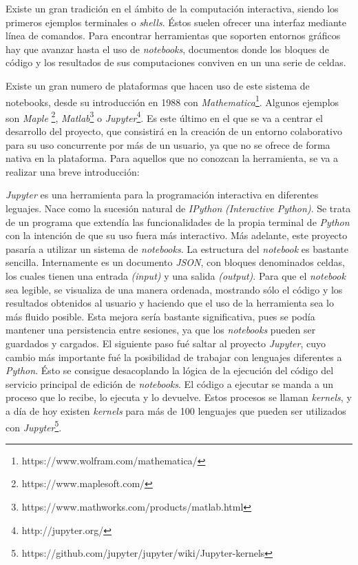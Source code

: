 \documentclass[11pt,spanish,listoffigures]{tfgetsinf}
\begin{document}
Existe un gran tradición en el ámbito de la computación interactiva, siendo los primeros ejemplos terminales o \textit{shells}. Éstos suelen ofrecer una interfaz mediante línea de comandos. Para encontrar herramientas que soporten entornos gráficos hay que avanzar hasta el uso de \textit{\gls{notebook}s}, documentos donde los bloques de código y los resultados de sus computaciones conviven en un una serie de celdas.

Existe un gran numero de plataformas que hacen uso de este sistema de notebooks, desde su introducción en 1988 con \textit{Mathematica}\footnote{https://www.wolfram.com/mathematica/}. Algunos ejemplos son \textit{Maple} \footnote{https://www.maplesoft.com/}, \textit{Matlab}\footnote{https://www.mathworks.com/products/matlab.html} o \textit{Jupyter}\footnote{http://jupyter.org/}. Es este último en el que se va a centrar el desarrollo del proyecto, que consistirá en la creación de un entorno colaborativo para su uso concurrente por más de un usuario, ya que no se ofrece de forma nativa en la plataforma. Para aquellos que no conozcan la herramienta, se va a realizar una breve introducción:

\textit{Jupyter } es una herramienta para la programación interactiva en diferentes leguajes. Nace como la sucesión natural de \textit{IPython} \textit{(Interactive Python)}. Se trata de un programa que extendía las funcionalidades de la propia terminal de \textit{Python} con la intención de que su uso fuera más interactivo. Más adelante, este proyecto pasaría a utilizar un sistema de \textit{notebooks}. La estructura del \textit{notebook} es bastante sencilla. Internamente es un documento \textit{\gls{JSON}}, con bloques denominados celdas, los cuales tienen una entrada \textit{(input)} y una salida \textit{(output)}. Para que el \textit{notebook} sea legible, se visualiza de una manera ordenada, mostrando sólo el código y los resultados obtenidos al usuario y haciendo que el uso de la herramienta sea lo más fluido posible.   
Esta mejora sería bastante significativa, pues se podía mantener una persistencia entre sesiones, ya que los \textit{notebooks} pueden ser guardados y cargados. El siguiente paso fué saltar al proyecto \textit{Jupyter}, cuyo cambio más importante fué la posibilidad de trabajar con lenguajes diferentes a \textit{Python}. Ésto se consigue desacoplando la lógica de la ejecución del código del servicio principal de edición de \textit{notebooks}. El código a ejecutar se manda a un proceso que lo recibe, lo ejecuta y lo devuelve. Estos procesos se llaman \textit{kernels}, y a día de hoy existen \textit{kernels} para más de 100 lenguajes que pueden ser utilizados con \textit{Jupyter}\footnote{https://github.com/jupyter/jupyter/wiki/Jupyter-kernels}.
\end{document}
